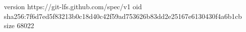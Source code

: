 version https://git-lfs.github.com/spec/v1
oid sha256:7f6d7ed5f83213b0c18d40c42f59ad753626b83dd2e25167e6130430f4a6b1cb
size 68022
